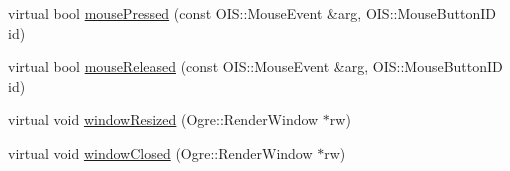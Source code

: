 \begin{DoxyCompactItemize}
\item 
virtual bool \hyperlink{class_base_application_a9255dfc1eabefd11c474ec45a6622504}{mouse\-Pressed} (const O\-I\-S\-::\-Mouse\-Event \&arg, O\-I\-S\-::\-Mouse\-Button\-I\-D id)
\item 
virtual bool \hyperlink{class_base_application_aa102c5859c14c0690c749994a446b53d}{mouse\-Released} (const O\-I\-S\-::\-Mouse\-Event \&arg, O\-I\-S\-::\-Mouse\-Button\-I\-D id)
\item 
virtual void \hyperlink{class_base_application_afacf8a797588592ef0abbad593f10cfa}{window\-Resized} (Ogre\-::\-Render\-Window $\ast$rw)
\item 
virtual void \hyperlink{class_base_application_ae0e37ac54a31ff6e51d58c7654ad1b90}{window\-Closed} (Ogre\-::\-Render\-Window $\ast$rw)
\end{DoxyCompactItemize}
